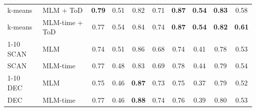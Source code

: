 \begin{table}[t]
\begin{tabular}{llcccccc|cc}
k-means & MLM + ToD & \textbf{0.79} & 0.51 & 0.82 & 0.71 & \textbf{0.87} & \textbf{0.54} & \textbf{0.83} & 0.58 \\
k-means & MLM-time + ToD & 0.77 & 0.54 & 0.84 & 0.74 & \textbf{0.87} & \textbf{0.54} & \textbf{0.82} & \textbf{0.61} \\
\cmidrule{1-10}
SCAN & MLM & 0.74 & 0.51 & 0.86 & 0.68 & 0.74 & 0.41 & 0.78 & 0.53 \\
SCAN & MLM-time & 0.77 & 0.48 & 0.83 & 0.69 & 0.78 & 0.44 & 0.79 & 0.54 \\
\cmidrule{1-10}
DEC & MLM & 0.75 & 0.46 & \textbf{0.87} & 0.73 & 0.75 & 0.37 & 0.79 & 0.52 \\
DEC & MLM-time & 0.77 & 0.46 & \textbf{0.88} & 0.74 & 0.76 & 0.39 & 0.80 & 0.53 \\
\bottomrule
\end{tabular}
\end{table}

